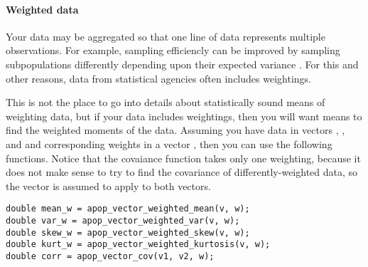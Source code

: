 

\paragraph{\treesymbol{} Weighted data} Your data may be aggregated so
that one line of data represents multiple observations. For example,
sampling efficiencly can be improved by sampling subpopulations
differently depending upon their expected variance \citep{sarndal:mass}.
For this and other reasons, data from statistical agencies often
includes weightings.

This is not the place to go into details about statistically sound means
of weighting data, but if your data includes weightings, then you will
want means to find the weighted moments of the data. Assuming you have
data in vectors , , and  and corresponding weights in a vector
, then you can use the following functions. Notice that the
covaiance function takes only one weighting, because it does not make
sense to try to find the covariance of differently-weighted data, so the
 vector is assumed to apply to both vectors.
 
 
\begin{lstlisting}
double mean_w = apop_vector_weighted_mean(v, w);
double var_w = apop_vector_weighted_var(v, w);
double skew_w = apop_vector_weighted_skew(v, w);
double kurt_w = apop_vector_weighted_kurtosis(v, w);
double corr = apop_vector_cov(v1, v2, w);
\end{lstlisting}

